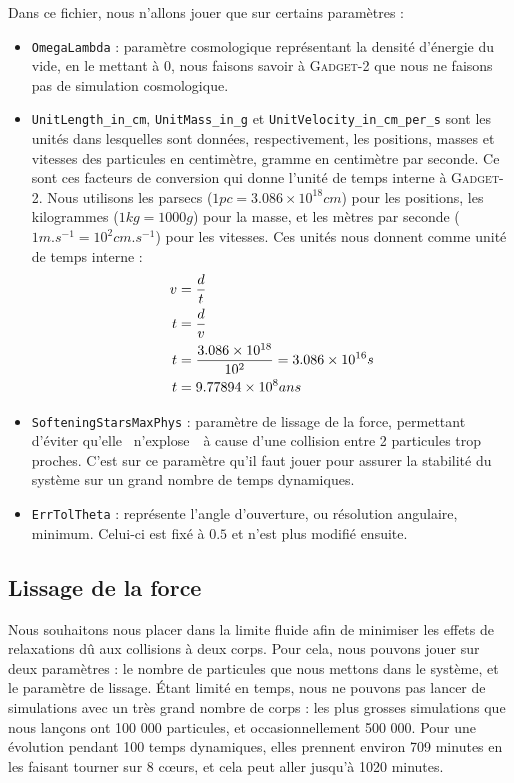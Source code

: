 			Dans ce fichier, nous n'allons jouer que sur certains paramètres :
			\begin{itemize}
				\item \verb|OmegaLambda| : paramètre cosmologique représentant la densité d'énergie du
					vide, en le mettant à 0, nous faisons savoir à \textsc{Gadget-2} que nous ne faisons pas
					de simulation cosmologique.
				\item \verb|UnitLength_in_cm|, \verb|UnitMass_in_g| et \verb|UnitVelocity_in_cm_per_s|
					sont les unités dans lesquelles sont données, respectivement, les positions, masses et vitesses des particules en
					centimètre, gramme en centimètre par seconde. Ce sont ces facteurs de conversion
					qui donne l'unité de temps interne à \textsc{Gadget-2}. Nous utilisons
					les parsecs ($ 1 pc = 3.086 \times 10^{18} cm$) pour les positions, les kilogrammes
					($1 kg = 1000 g$) pour la masse, et les mètres par seconde ($ 1 m.s^{-1} = 10^2 cm.s^{-1}$)
					pour les vitesses. Ces unités nous donnent comme unité de temps
					interne :
					\begin{align}
						v &= \frac{d}{t} \notag \\
						t &= \frac{d}{v} \notag \\
						t &= \frac{3.086 \times 10^{18}}{10^2} = 3.086 \times 10^{16} s \notag \\
						t &= 9.77894 \times 10^8 ans
					\end{align}
				\item \verb|SofteningStarsMaxPhys| : paramètre de lissage de la force, permettant d'éviter
					qu'elle \og~n'explose~\fg~à cause d'une collision entre 2 particules trop proches.
					C'est sur ce paramètre qu'il faut jouer pour assurer la stabilité du système sur
					un grand nombre de temps dynamiques.
				\item \verb|ErrTolTheta| : représente l'angle d'ouverture, ou résolution angulaire, minimum.
					Celui-ci est fixé à $0.5$ et n'est plus modifié ensuite.
			\end{itemize}

		\subsection{Lissage de la force}

			Nous souhaitons nous placer dans la limite fluide afin
			de minimiser les effets de relaxations dû aux
			collisions à deux corps. Pour cela, nous pouvons jouer
			sur deux paramètres : le nombre de particules que nous
			mettons dans le système, et le paramètre de lissage.
			Étant limité en temps, nous ne pouvons pas lancer de
			simulations avec un très grand nombre de corps : les
			plus grosses simulations que nous lançons ont 100 000
			particules, et occasionnellement 500 000. Pour une
			évolution pendant 100 temps dynamiques, elles prennent
			environ 709 minutes en les faisant tourner sur 8 cœurs,
			et cela peut aller jusqu'à 1020 minutes.

